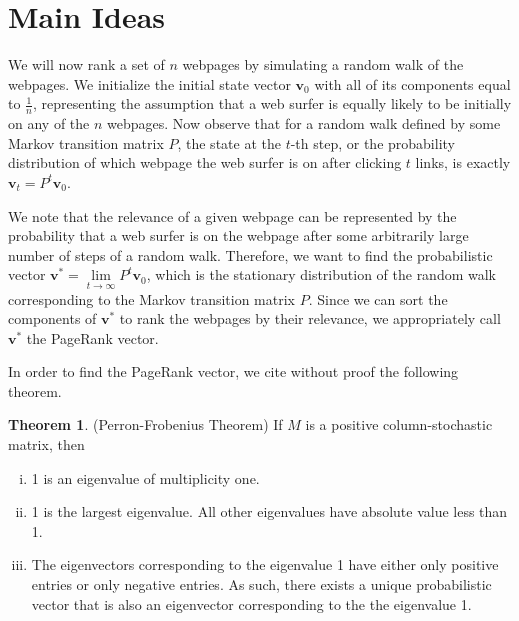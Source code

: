 \documentclass[11pt]{article}
\theoremstyle{definition}
\newtheorem{theorem}{Theorem}
\renewcommand{\vec}[1]{\mathbf{#1}}
\begin{document}
\section{Main Ideas}


We will now rank a set of $n$ webpages by simulating a random walk of the webpages.
We initialize the initial state vector $\vec{v}_0$ with all of its components equal to $\frac{1}{n}$,
representing the assumption that a web surfer is equally likely to be initially on any of the $n$ webpages.
Now observe that for a random walk defined by some Markov transition matrix $P$, the state at the $t$-th step,
or the probability distribution of which webpage the web surfer is on after clicking $t$ links, is exactly $\vec{v}_t = P^t \vec{v}_0$.

We note that the relevance of a given webpage can be represented by the probability that a web surfer is on the webpage after some arbitrarily large number of steps of a random walk.
Therefore, we want to find the probabilistic vector $\vec{v}^* = \lim\limits_{t\to \infty}{P^t \vec{v}_0}$,
which is the stationary distribution of the random walk corresponding to the Markov transition matrix $P$.
Since we can sort the components of $\vec{v}^*$ to rank the webpages by their relevance, we appropriately call $\vec{v}^*$ the PageRank vector.


In order to find the PageRank vector, we cite without proof the following theorem.
\begin{theorem}
    (Perron-Frobenius Theorem) If $M$ is a positive column-stochastic matrix, then
    \begin{enumerate}[i.]
        \item 1 is an eigenvalue of multiplicity one.
        \item 1 is the largest eigenvalue. All other eigenvalues have absolute value less than 1.
        \item The eigenvectors corresponding to the eigenvalue 1 have either only positive entries or only negative entries.
        As such, there exists a unique probabilistic vector that is also an eigenvector corresponding to the the eigenvalue 1.
    \end{enumerate}
\end{theorem}
\end{document}
